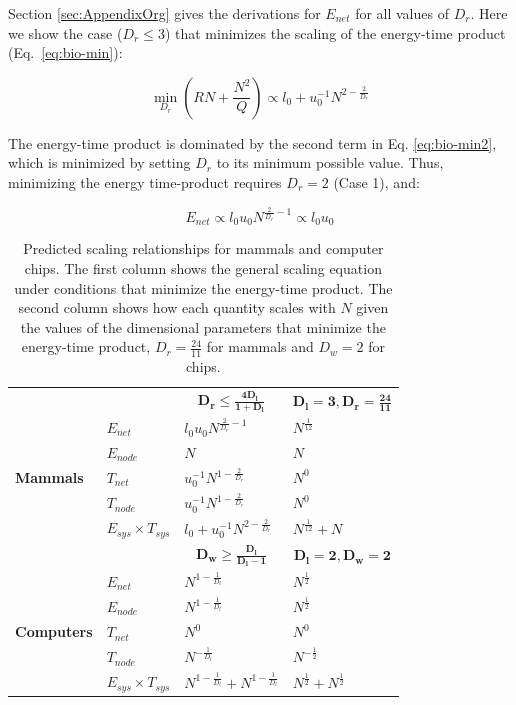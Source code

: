 \documentclass[12pt]{article}
\newcommand\T{\rule{0pt}{3ex}}       %
\newcommand\B{\rule[-1.2ex]{0pt}{0pt}} %
\begin{document}
Section \ref{sec:AppendixOrg} gives the derivations for $E_{net}$
for all values of $D_r$. Here we show the case ($D_r \leq 3$) that minimizes
the scaling of the energy-time product (Eq.~\ref{eq:bio-min}):

\begin{equation}
  \min_{D_r} (RN + \frac{N^2}{Q})
  \propto l_0 + u_0^{-1}N^{2-\frac{2}{D_r}}
\label{eq:bio-min2}
\end{equation}


The energy-time product is dominated by the second term in Eq.
\ref{eq:bio-min2}, which is minimized by setting $D_r$ to its minimum possible
value. Thus, minimizing the energy time-product requires $D_r = 2$
(Case 1), and:

\begin{equation}
E_{net} \propto l_0 u_0 N^{\frac{2}{D_r}-1} \propto l_0 u_0
\label{eq:EnetOrg}
\end{equation}


\begin{table}
\centering
\begin{tabular}{l|l||l|l|}
\multicolumn{2}{l}{} & \multicolumn{1}{c}{$\mathbf{D_r \leq
\frac{4D_l}{1+D_l}}$} & \multicolumn{1}{c}{$\mathbf{D_l=3, D_r=\frac{24}{11}}$}
  \T \B \\
  \cline{2-4}
\multirow{5}{*}{\textbf{Mammals}} & $E_{net}$ &$l_0u_0 N^{\frac{2}{D_r}-1}$ &
  $N^{\frac{1}{12}}$ \T \\
\cline{2-4}
& $E_{node}$ &  $N$ & $N$ \T \\
\cline{2-4}
& $T_{net}$ & $u_0^{-1}N^{1-\frac{2}{D_r}}$ & $N^0$ \T \\
\cline{2-4}
& $T_{node}$ & $u_0^{-1}N^{1-\frac{2}{D_r}}$ & $N^0$ \T \\  

\cline{2-4}
& $E_{sys} \times T_{sys}$ & $l_0 + u_0^{-1}N^{2-\frac{2}{D_r}}$ &
$N^{\frac{1}{12}} + N$ \T \\
\cline{2-4}
\multicolumn{2}{c}{}  & \multicolumn{1}{c}{$\mathbf{D_w \geq
\frac{D_l}{D_l-1}}$} & \multicolumn{1}{c}{$\mathbf{D_l=2,D_w =2}$} \T \B \\
\cline{2-4}
\multirow{5}{*}{\textbf{Computers}} & $E_{net}$ & $N^{1-\frac{1}{D_l}}$&
$N^{\frac{1}{2}}$ \T \\
\cline{2-4}
& $E_{node}$&$N^{1-\frac{1}{D_l}}$ &$N^{\frac{1}{2}}$ \T \\
\cline{2-4}
& $T_{net}$ & $N^{0}$& $N^{0}$ \T \\
\cline{2-4}
& $T_{node}$& $N^{-\frac{1}{D_l}}$& $N^{-\frac{1}{2}}$ \T \\
\cline{2-4}
& $E_{sys} \times T_{sys}$ &$N^{1-\frac{1}{D_l}} + N^{1-\frac{1}{D_l}}$
&$N^{\frac{1}{2}} + N^{\frac{1}{2}}$ \T \\
\cline{2-4}
\end{tabular}
\caption{Predicted scaling relationships for mammals and computer chips. The first column shows the general scaling equation under conditions that minimize the energy-time product. The second column shows how each quantity scales with $N$ given the values of the dimensional parameters that minimize the energy-time product, $D_r = \frac{24}{11}$ for mammals and $D_w = 2$ for chips. 
\label{tab:Predictions}}
\end{table}
\end{document}
